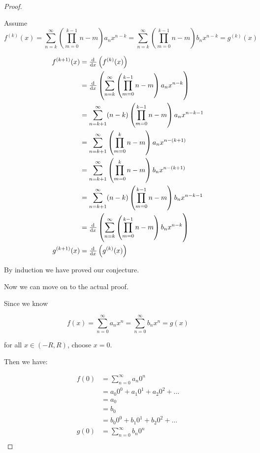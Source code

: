 \documentclass[12pt,letterpaper]{article}
\begin{document}
\begin{enumerate}
\begin{enumerate}
\begin{proof}
\begin{itemize}
                Assume
                \[
                  f^{(k)}(x) = \sum_{n = k}^{\infty} \left(\prod_{m = 0}^{k - 1} n - m\right) a_n x^{n - k} = \sum_{n = k}^{\infty} \left(\prod_{m = 0}^{k - 1} n - m\right) b_n x^{n - k} = g^{(k)}(x)
                \]

                \begin{align*}
                  f^{(k + 1)}(x) &= \od{}{x}\left(f^{(k)}(x)\right) \\
                  &= \od{}{x}\left(\sum_{n = k}^{\infty} \left(\prod_{m = 0}^{k - 1} n - m\right) a_n x^{n - k}\right) \\
                  &= \sum_{n = k + 1}^{\infty} (n - k)\left(\prod_{m = 0}^{k - 1} n - m\right) a_n x^{n - k - 1} \\
                  &= \sum_{n = k + 1}^{\infty} \left(\prod_{m = 0}^{k} n - m\right) a_n x^{n - (k + 1)} \\
                  &= \sum_{n = k + 1}^{\infty} \left(\prod_{m = 0}^{k} n - m\right) b_n x^{n - (k + 1)} \\
                  &= \sum_{n = k + 1}^{\infty} (n - k)\left(\prod_{m = 0}^{k - 1} n - m\right) b_n x^{n - k - 1} \\
                  &= \od{}{x}\left(\sum_{n = k}^{\infty} \left(\prod_{m = 0}^{k - 1} n - m\right) b_n x^{n - k}\right) \\
                  g^{(k + 1)}(x) &= \od{}{x}\left(g^{(k)}(x)\right) \\
                \end{align*}
            \end{itemize}

            By induction we have proved our conjecture.

            Now we can move on to the actual proof.

            Since we know

            \[
              f(x) = \sum_{n = 0}^{\infty} a_n x^n = \sum_{n = 0}^{\infty} b_n x^n = g(x)
            \]

            for all $x \in (-R, R)$, choose $x = 0$.

            Then we have:

            \begin{align*}
              f(0) &= \sum_{n = 0}^{\infty} a_n 0^n \\
              &= a_0 0^0 + a_1 0^1 + a_2 0^2 + \dots \\
              &= a_0 \\
              &= b_0 \\
              &= b_0 0^0 + b_1 0^1 + b_2 0^2 + \dots \\
              g(0) &= \sum_{n = 0}^{\infty} b_n 0^n \\
            \end{align*}


\end{proof}
\end{enumerate}
\end{enumerate}
\end{document}
